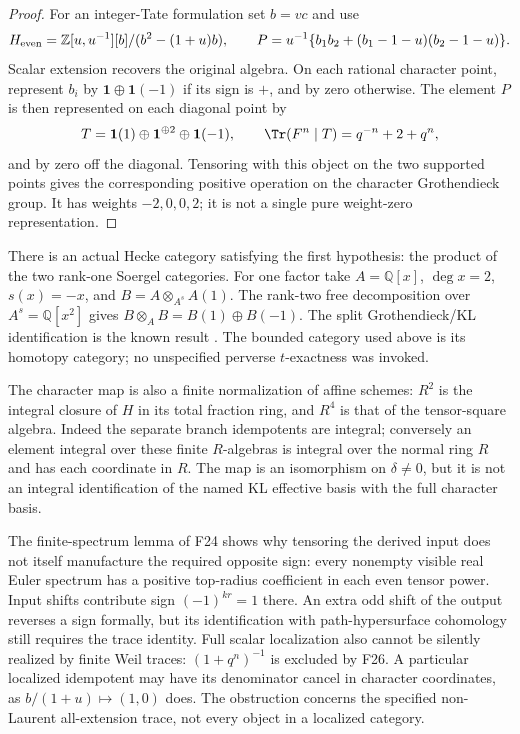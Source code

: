 \documentclass[11pt,a4paper]{article}
\newcommand{\Q}{\mathbb Q}\newcommand{\Z}{\mathbb Z}\newcommand{\C}{\mathbb C}\newcommand{\N}{\mathbb N}\newcommand{\F}{\mathbb F}
\renewcommand{\S}{\ensuremath{\mathsection}}
\newcommand{\fid}[1]{\textsf{#1}}\newcommand{\gate}[1]{\textsf{#1}}
\theoremstyle{named}\newtheorem{finding}{Finding}[section]
\theoremstyle{definition}\newtheorem{definition}[finding]{Definition}
\theoremstyle{remark}\newtheorem{remark}[finding]{Remark}
\begin{document}
\begin{proof}
For an integer-Tate formulation set $b=vc$ and use
\[
 H_{\rm even}=\Z[u,u^{-1}][b]/(b^2-(1+u)b),\qquad
 P=u^{-1}\{b_1b_2+(b_1-1-u)(b_2-1-u)\}.
\]
Scalar extension recovers the original algebra. On each rational
character point, represent $b_i$ by $\mathbf1\oplus\mathbf1(-1)$
if its sign is $+$, and by zero otherwise. The element $P$ is then
represented on each diagonal point by
\[
 T=\mathbf1(1)\oplus\mathbf1^{\oplus2}\oplus\mathbf1(-1),
 \qquad \Tr(F^n\mid T)=q^{-n}+2+q^n,
\]
and by zero off the diagonal. Tensoring with this object on the
two supported points gives the corresponding positive operation on
the character Grothendieck group. It has weights $-2,0,0,2$;
it is not a single pure weight-zero representation.
\end{proof}

There is an actual Hecke category satisfying the first hypothesis:
the product of the two rank-one Soergel categories. For one factor
take $A=\Q[x]$, $\deg x=2$, $s(x)=-x$, and
$B=A\otimes_{A^s}A(1)$. The rank-two free decomposition over
$A^s=\Q[x^2]$ gives $B\otimes_A B=B(1)\oplus B(-1)$.
The split Grothendieck/KL identification is the known result
\cite[\S3.5, Theorem~3.5, pp.~1107--1108; Theorem~1.1, p.~1093]{EW}.
The bounded category used above is its homotopy category; no
unspecified perverse $t$-exactness was invoked.

The character map is also a finite normalization of affine schemes:
$R^2$ is the integral closure of $H$ in its total fraction ring,
and $R^4$ is that of the tensor-square algebra. Indeed the separate
branch idempotents are integral; conversely an element integral over
these finite $R$-algebras is integral over the normal ring $R$ and
has each coordinate in $R$. The map is an isomorphism on
$\delta\ne0$, but it is not an integral identification of the named
KL effective basis with the full character basis.

The finite-spectrum lemma of \fid{F24} shows why tensoring the
derived input does not itself manufacture the required opposite sign:
every nonempty visible real Euler spectrum has a positive top-radius
coefficient in each even tensor power. Input shifts contribute sign
$(-1)^{kr}=1$ there. An extra odd shift of the output reverses a sign
formally, but its identification with path-hypersurface cohomology
still requires the trace identity. Full scalar localization also
cannot be silently realized by finite Weil traces:
$(1+q^n)^{-1}$ is excluded by \fid{F26}. A particular localized
idempotent may have its denominator cancel in character coordinates,
as $b/(1+u)\mapsto(1,0)$ does. The obstruction concerns the specified
non-Laurent all-extension trace, not every object in a localized
category.
\end{document}
